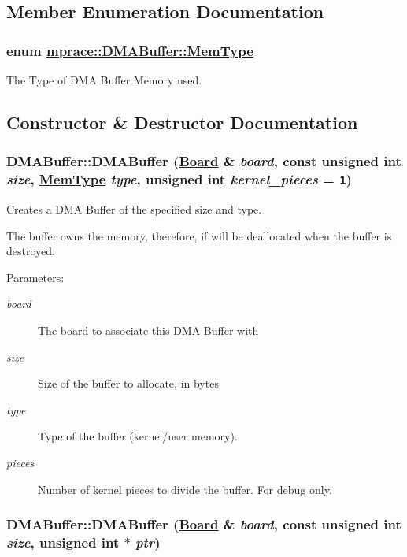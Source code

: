 \subsection{Member Enumeration Documentation}
\hypertarget{classmprace_1_1DMABuffer_w3}{
\subsubsection[MemType]{\setlength{\rightskip}{0pt plus 5cm}enum \hyperlink{classmprace_1_1DMABuffer_w3}{mprace::DMABuffer::Mem\-Type}}}
\label{classmprace_1_1DMABuffer_w3}


The Type of DMA Buffer Memory used. 



\subsection{Constructor \& Destructor Documentation}
\hypertarget{classmprace_1_1DMABuffer_a0}{
\subsubsection[DMABuffer]{\setlength{\rightskip}{0pt plus 5cm}DMABuffer::DMABuffer (\hyperlink{classmprace_1_1Board}{Board} \& {\em board}, const unsigned int {\em size}, \hyperlink{classmprace_1_1DMABuffer_w3}{Mem\-Type} {\em type}, unsigned int {\em kernel\_\-pieces} = {\tt 1})}}
\label{classmprace_1_1DMABuffer_a0}


Creates a DMA Buffer of the specified size and type. 

The buffer owns the memory, therefore, if will be deallocated when the buffer is destroyed.

\begin{Desc}
\item[Parameters:]
\begin{description}
\item[{\em board}]The board to associate this DMA Buffer with \item[{\em size}]Size of the buffer to allocate, in bytes \item[{\em type}]Type of the buffer (kernel/user memory). \item[{\em pieces}]Number of kernel pieces to divide the buffer. For debug only.\end{description}
\end{Desc}
\hypertarget{classmprace_1_1DMABuffer_a1}{
\subsubsection[DMABuffer]{\setlength{\rightskip}{0pt plus 5cm}DMABuffer::DMABuffer (\hyperlink{classmprace_1_1Board}{Board} \& {\em board}, const unsigned int {\em size}, unsigned int $\ast$ {\em ptr})}}
\label{classmprace_1_1DMABuffer_a1}


